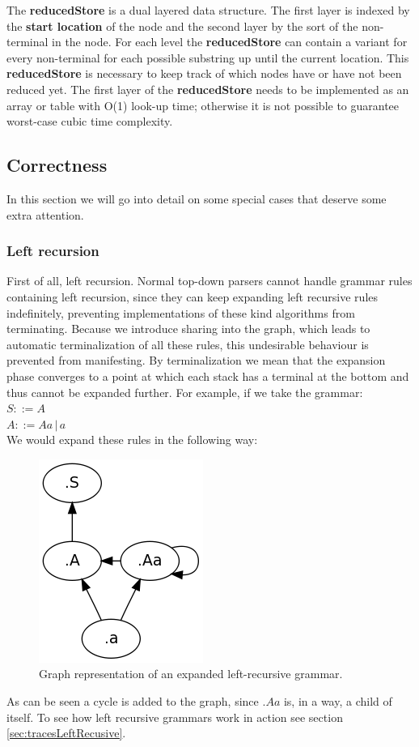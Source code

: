 \documentclass[a4paper,10pt]{article}
\begin{document}
The {\bf reducedStore} is a dual layered data structure. The first layer is indexed by the {\bf start location} of the node and the second layer by the sort of the non-terminal in the node. For each level the {\bf reducedStore} can contain a variant for every non-terminal for each possible substring up until the current location. This {\bf reducedStore} is necessary to keep track of which nodes have or have not been reduced yet. The first layer of the {\bf reducedStore} needs to be implemented as an array or table with O(1) look-up time; otherwise it is not possible to guarantee worst-case cubic time complexity.

\subsection{Correctness}

In this section we will go into detail on some special cases that deserve some extra attention.

\subsubsection{Left recursion}
First of all, left recursion. Normal top-down parsers cannot handle grammar rules containing left recursion, since they can keep expanding left recursive rules indefinitely, preventing implementations of these kind algorithms from terminating. Because we introduce sharing into the graph, which leads to automatic terminalization of all these rules, this undesirable behaviour is prevented from manifesting. By terminalization we mean that the expansion phase converges to a point at which each stack has a terminal at the bottom and thus cannot be expanded further. For example, if we take the grammar:\\
$S ::= A$\\
$A ::= Aa\,|\,a$\\
We would expand these rules in the following way:
\begin{figure}[H]
\centering
\includegraphics[scale=0.5]{left-recursive.png}
\caption{Graph representation of an expanded left-recursive grammar.}
\end{figure}
As can be seen a cycle is added to the graph, since $.Aa$ is, in a way, a child of itself. To see how left recursive grammars work in action see section \ref{sec:tracesLeftRecusive}.
\end{document}
